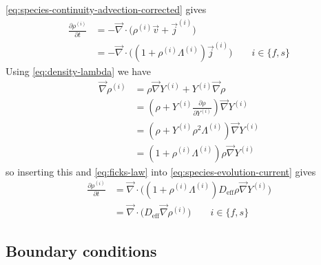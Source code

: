 \documentclass[12pt,twoside]{report}
\begin{document}
\eqref{eq:species-continuity-advection-corrected} gives
\begin{equation}\label{eq:species-evolution-current}
  \begin{aligned}
    \frac{\partial \rho^{(i)}}{\partial t} &=
    - \vec{\nabla} \cdot \Big(
    \rho^{(i)} \vec{v} + \vec{j}^{(i)}
    \Big)
    \\
    &=
    - \vec{\nabla} \cdot \Big(
    (1 + \rho^{(i)} \Lambda^{(i)}) \vec{j}^{(i)}
    \Big)
    \qquad i \in \{f,s\}
  \end{aligned}
\end{equation}
Using \eqref{eq:density-lambda} we have
\begin{equation*}
  \begin{aligned}
    \vec{\nabla} \rho^{(i)} &=
    \rho \vec{\nabla} Y^{(i)} +
    Y^{(i)} \vec{\nabla} \rho \\
    &=
    \left(
    \rho + Y^{(i)} \frac{\partial \rho}{\partial Y^{(i)}}
    \right)
    \vec{\nabla} Y^{(i)}
    \\
    &=
    \left(
    \rho +
    Y^{(i)} \rho^2 \Lambda^{(i)}
    \right)
    \vec{\nabla} Y^{(i)} \\
    &=
    \left(
    1 +
    \rho^{(i)} \Lambda^{(i)}
    \right)
    \rho
    \vec{\nabla} Y^{(i)}
  \end{aligned}
\end{equation*}
so inserting this and \eqref{eq:ficks-law} into \eqref{eq:species-evolution-current} gives
\begin{equation}\label{eq:species-evolution-final}
  \begin{aligned}
    \frac{\partial \rho^{(i)}}{\partial t} &=
    \vec{\nabla} \cdot \Big(
    (1 + \rho^{(i)} \Lambda^{(i)})
    D_{\textrm{eff}} \rho \vec{\nabla} Y^{(i)}
    \Big) \\
    &=
    \vec{\nabla} \cdot \Big(
    D_{\textrm{eff}} \vec{\nabla} \rho^{(i)}
    \Big)
    \qquad i \in \{f,s\}
  \end{aligned}
\end{equation}

\subsection{Boundary conditions}
\end{document}
